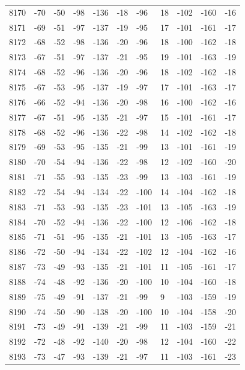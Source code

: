 \begin{table}[H]
\begin{tabular}{lllllllllll}
8170 & -70 & -50 & -98 & -136 & -18 & -96 & 18 & -102 & -160 & -16 \\
8171 & -69 & -51 & -97 & -137 & -19 & -95 & 17 & -101 & -161 & -17 \\
8172 & -68 & -52 & -98 & -136 & -20 & -96 & 18 & -100 & -162 & -18 \\
8173 & -67 & -51 & -97 & -137 & -21 & -95 & 19 & -101 & -163 & -19 \\
8174 & -68 & -52 & -96 & -136 & -20 & -96 & 18 & -102 & -162 & -18 \\
8175 & -67 & -53 & -95 & -137 & -19 & -97 & 17 & -101 & -163 & -17 \\
8176 & -66 & -52 & -94 & -136 & -20 & -98 & 16 & -100 & -162 & -16 \\
8177 & -67 & -51 & -95 & -135 & -21 & -97 & 15 & -101 & -161 & -17 \\
8178 & -68 & -52 & -96 & -136 & -22 & -98 & 14 & -102 & -162 & -18 \\
8179 & -69 & -53 & -95 & -135 & -21 & -99 & 13 & -101 & -161 & -19 \\
8180 & -70 & -54 & -94 & -136 & -22 & -98 & 12 & -102 & -160 & -20 \\
8181 & -71 & -55 & -93 & -135 & -23 & -99 & 13 & -103 & -161 & -19 \\
8182 & -72 & -54 & -94 & -134 & -22 & -100 & 14 & -104 & -162 & -18 \\
8183 & -71 & -53 & -93 & -135 & -23 & -101 & 13 & -105 & -163 & -19 \\
8184 & -70 & -52 & -94 & -136 & -22 & -100 & 12 & -106 & -162 & -18 \\
8185 & -71 & -51 & -95 & -135 & -21 & -101 & 13 & -105 & -163 & -17 \\
8186 & -72 & -50 & -94 & -134 & -22 & -102 & 12 & -104 & -162 & -16 \\
8187 & -73 & -49 & -93 & -135 & -21 & -101 & 11 & -105 & -161 & -17 \\
8188 & -74 & -48 & -92 & -136 & -20 & -100 & 10 & -104 & -160 & -18 \\
8189 & -75 & -49 & -91 & -137 & -21 & -99 & 9 & -103 & -159 & -19 \\
8190 & -74 & -50 & -90 & -138 & -20 & -100 & 10 & -104 & -158 & -20 \\
8191 & -73 & -49 & -91 & -139 & -21 & -99 & 11 & -103 & -159 & -21 \\
8192 & -72 & -48 & -92 & -140 & -20 & -98 & 12 & -104 & -160 & -22 \\
8193 & -73 & -47 & -93 & -139 & -21 & -97 & 11 & -103 & -161 & -23 \\

\end{tabular}
\end{table}
